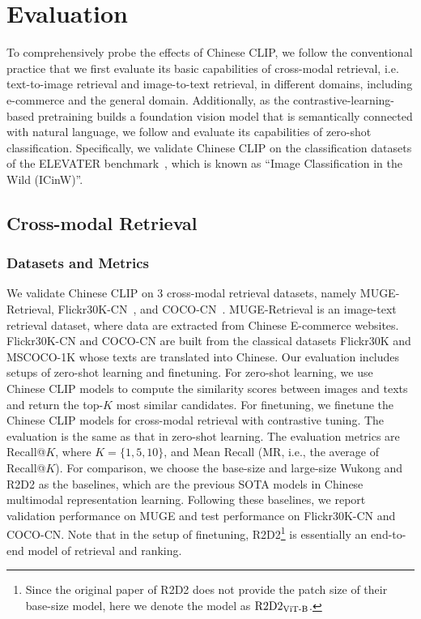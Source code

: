 

\section{Evaluation}
To comprehensively probe the effects of Chinese CLIP, we follow the conventional practice that we first evaluate its basic capabilities of cross-modal retrieval, i.e. text-to-image retrieval and image-to-text retrieval, in different domains, including e-commerce and the general domain. 
Additionally, as the contrastive-learning-based pretraining builds a foundation vision model that is semantically connected with natural language, we follow \citet{clip} and evaluate its capabilities of zero-shot classification. Specifically, we validate Chinese CLIP on the classification datasets of the ELEVATER benchmark~\citep{elevater}, which is known as ``Image Classification in the Wild (ICinW)''. 

\subsection{Cross-modal Retrieval}

\subsubsection{Datasets and Metrics}
We validate Chinese CLIP on $3$ cross-modal retrieval datasets, namely MUGE-Retrieval, Flickr30K-CN~\cite{flickr30k-cn}, and COCO-CN~\cite{coco-cn}. 
MUGE-Retrieval is an image-text retrieval dataset, where data are extracted from Chinese E-commerce websites. 
Flickr30K-CN and COCO-CN are built from the classical datasets Flickr30K and MSCOCO-1K whose texts are translated into Chinese. 
Our evaluation includes setups of zero-shot learning and finetuning. 
For zero-shot learning, we use Chinese CLIP models to compute the similarity scores between images and texts and return the top-$K$ most similar candidates. For finetuning, we finetune the Chinese CLIP models for cross-modal retrieval with contrastive tuning. The evaluation is the same as that in zero-shot learning. 
The evaluation metrics are Recall@$K$, where $K = \{1, 5, 10\}$, and Mean Recall (MR, i.e., the average of Recall@$K$). 
For comparison, we choose the base-size and large-size Wukong and R2D2 as the baselines, which are the previous SOTA models in Chinese multimodal representation learning. 
Following these baselines, we report validation performance on MUGE and test performance on Flickr30K-CN and COCO-CN.
Note that in the setup of finetuning, R2D2\footnote{Since the original paper of R2D2 does not provide the patch size of their base-size model, here we denote the model as $\text{R2D2}\rm_{ViT\text{-}B}$.} is essentially an end-to-end model of retrieval and ranking. 

